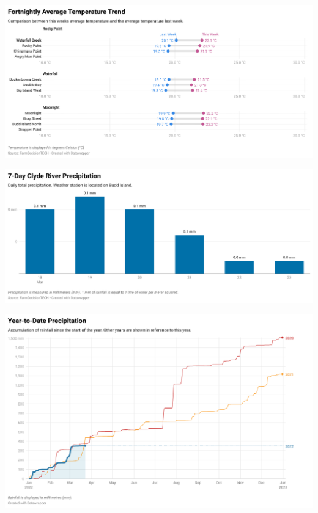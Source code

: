 \documentclass[10pt]{article}
\begin{document}
\begin{SidewaysFigure}
\centering
\includegraphics[width=1.3\textwidth]{fortnightly-temperature.png}
\end{SidewaysFigure}
\vfill
\newpage

\begin{SidewaysFigure}
\centering
\includegraphics[width=1.3\textwidth]{weekly-precipitation.png}
\end{SidewaysFigure}
\vfill
\newpage

\begin{SidewaysFigure}
\centering
\includegraphics[width=1.3\textwidth]{yearly-precipitation.png}
\end{SidewaysFigure}
\vfill
\newpage
\end{document}
